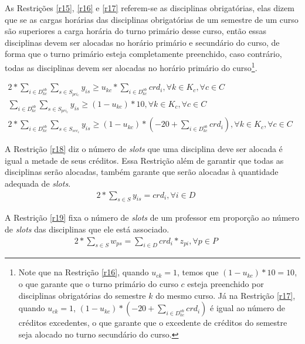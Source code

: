 As Restrições \ref{r15}, \ref{r16} e \ref{r17} referem-se as disciplinas obrigatórias, elas dizem que se as cargas horárias das disciplinas obrigatórias de um semestre de um curso são superiores a carga horária do turno primário desse curso, então essas disciplinas devem ser alocadas no horário primário e secundário do curso, de forma que o turno primário esteja completamente preenchido, caso contrário, todas as disciplinas devem ser alocadas no horário primário do curso\footnote{Note que na Restrição \ref{r16}, quando $u_{ck} = 1$, temos que $(1 - u_{kc}) * 10 = 10$, o que garante que o turno primário do curso $c$ esteja preenchido por disciplinas obrigatórias do semestre $k$ do mesmo curso. Já na Restrição \ref{r17}, quando $u_{ck} = 1$, $(1 - u_{kc}) * (-20+\sum_{i \in{D_{kc}^{ob}}}^{}{crd_i})$ é igual ao número de créditos excedentes, o que garante que o excedente de créditos do semestre seja alocado no turno secundário do curso.}.
 
\begin{eqnarray}
\label{r15}
2*\sum_{i \in{D_{kc}^{ob}}}^{}{\sum_{s\in{S_{pri_c}}}^{}{y_{is}}}\geq u_{kc} * \sum_{i \in{D_{kc}^{ob}}}^{}{crd_i}, \forall{k}\in{K_c}, \forall{c}\in{C}  &&\\
\label{r16}
\sum_{i \in{D_{kc}^{ob}}}^{}{\sum_{s \in{S_{pri_c}}}^{}{y_{is}}} \geq (1 - u_{kc}) * 10, \forall{k}\in{K_c}, \forall{c}\in{C}  &&\\
\label{r17}
2*\sum_{i \in{D_{kc}^{ob}}}^{}{\sum_{s \in{S_{sec_c}}}^{}{y_{is}}}\geq (1 - u_{kc}) * (-20+\sum_{i \in{D_{kc}^{ob}}}^{}{crd_i}),\forall{k}\in{K_c}, \forall{c}\in{C}&&
\end{eqnarray}

A Restrição \ref{r18} diz o número de \textit{slots} que uma disciplina deve ser alocada é igual a metade de seus créditos. Essa Restrição além de garantir que todas as disciplinas serão alocadas, também garante que serão alocadas à quantidade adequada de \textit{slots}.
\begin{eqnarray}
\label{r18}
2*\sum_{s \in S}^{}{y_{is}} = crd_i, \forall{i}\in{D}  &&
\end{eqnarray}

A Restrição \ref{r19} fixa o número de \textit{slots} de um professor em proporção ao número de \textit{slots} das disciplinas que ele está associado.
\begin{eqnarray}
\label{r19}
2 * \sum_{s \in S}^{}{w_{ps}} = \sum_{i \in D}^{}{crd_i * z_{pi}}, \forall{p}\in{P} &&
\end{eqnarray}

